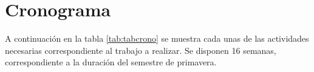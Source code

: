 \chapter{Cronograma}

A continuación en la tabla \ref{tab:tabcrono} se muestra cada unas de las actividades necesarias correspondiente al trabajo a realizar. Se disponen 16 semanas, correspondiente a la duración del semestre de primavera.



